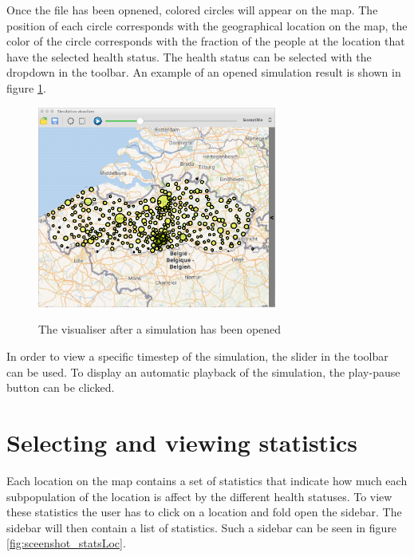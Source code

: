 Once the file has been opnened, colored circles will appear on the map. The position of each circle corresponds with the geographical location on the map, the color of the circle corresponds with the fraction of the people at the location that have the selected health status. The health status can be selected with the dropdown in the toolbar. An example of an opened simulation result is shown in figure \ref{fig:screenshot_viewSimul}.

\begin{figure}[H]
\centering
\includegraphics[width=0.7\textwidth,keepaspectratio]{images/view_simul.png}
\label{fig:screenshot_viewSimul}
\caption{The visualiser after a simulation has been opened}
\end{figure}

In order to view a specific timestep of the simulation, the slider in the toolbar can be used. To display an automatic playback of the simulation, the play-pause button can be clicked.

\section{Selecting and viewing statistics}
\label{section:stats_selection}

Each location on the map contains a set of statistics that indicate how much each subpopulation of the location is affect by the different health statuses. To view these statistics the user has to click on a location and fold open the sidebar. The sidebar will then contain a list of statistics. Such a sidebar can be seen in figure \ref{fig:sceenshot_statsLoc}.

